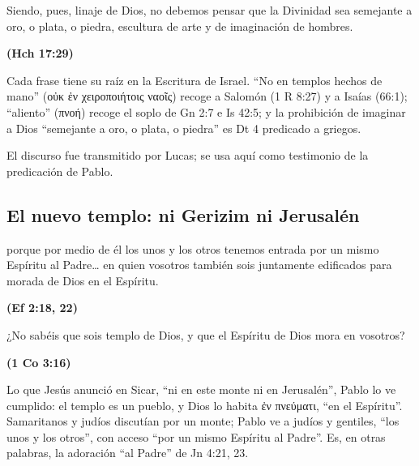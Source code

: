 \documentclass[11pt,letterpaper]{article}
\newcommand{\grc}[1]{\foreignlanguage{ancientgreek}{#1}}
\newcommand{\fuente}[1]{\par\hfill{\upshape\bfseries\small\textcolor{azul}{#1}}}
\begin{document}
\begin{cita}Siendo, pues, linaje de Dios, no debemos pensar que la Divinidad sea semejante a oro, o plata, o piedra, escultura de arte y de imaginación de hombres.\fuente{(Hch 17:29)}\end{cita}

Cada frase tiene su raíz en la Escritura de Israel. ``No en templos hechos de mano'' (\grc{οὐκ ἐν χειροποιήτοις ναοῖς}) recoge a Salomón (1 R 8:27) y a Isaías (66:1); ``aliento'' (\grc{πνοή}) recoge el soplo de Gn 2:7 e Is 42:5; y la prohibición de imaginar a Dios ``semejante a oro, o plata, o piedra'' es Dt 4 predicado a griegos.

\begin{nota}[Precisión]
El discurso fue transmitido por Lucas; se usa aquí como testimonio de la predicación de Pablo.
\end{nota}

\subsection{El nuevo templo: ni Gerizim ni Jerusalén}

\begin{cita}porque por medio de él los unos y los otros tenemos entrada por un mismo Espíritu al Padre\ldots{} en quien vosotros también sois juntamente edificados para morada de Dios en el Espíritu.\fuente{(Ef 2:18, 22)}\end{cita}

\begin{cita}¿No sabéis que sois templo de Dios, y que el Espíritu de Dios mora en vosotros?\fuente{(1 Co 3:16)}\end{cita}

Lo que Jesús anunció en Sicar, ``ni en este monte ni en Jerusalén'', Pablo lo ve cumplido: el templo es un pueblo, y Dios lo habita \grc{ἐν πνεύματι}, ``en el Espíritu''. Samaritanos y judíos discutían por un monte; Pablo ve a judíos y gentiles, ``los unos y los otros'', con acceso ``por un mismo Espíritu al Padre''. Es, en otras palabras, la adoración ``al Padre'' de Jn 4:21, 23.
\end{document}
